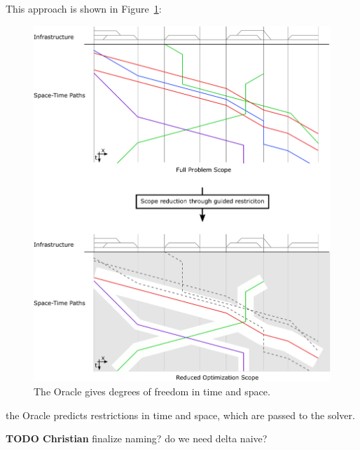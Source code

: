 \documentclass{article}
\begin{document}
This approach is shown in Figure~\ref{fig:introduction_time_space}:
%
\begin{figure}[hbtp]
	\centering
  \includegraphics[width=\textwidth]{Figures/rsp_rescheduling_rsp.pdf}
	\caption{The Oracle gives degrees of freedom in time and space.}
	\label{fig:introduction_time_space}
\end{figure}
the Oracle predicts restrictions in time and space, which are passed to the solver.


\begin{mdframed}
{\bf TODO Christian} finalize naming? do we need delta naive?
\end{mdframed}
\end{document}
